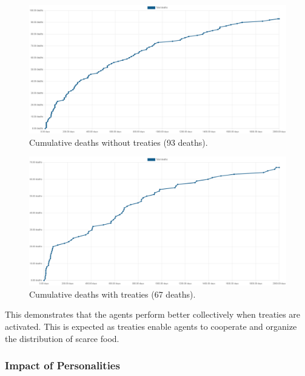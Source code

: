 \begin{figure}[h!]
    \begin{center}
        \includegraphics[scale=0.25]{009_team_7_agent_design/Images/Cumulative Deaths, WO Treaties, T7Only, 2000days, 20food, 93deaths.png}
    \end{center}
    \caption{Cumulative deaths without treaties (93 deaths).}
    \label{fig: Cumulative Deaths without Treaties}
\end{figure}

\begin{figure}[h!]
    \begin{center}
        \includegraphics[scale=0.25]{009_team_7_agent_design/Images/Cumulative Deaths, With Treaties, T7Only, 2000days, 20food, 67deaths.png}
    \end{center}
    \caption{Cumulative deaths with treaties (67 deaths).}
    \label{fig: Cumulative Deaths with Treaties}
\end{figure}

This demonstrates that the agents perform better collectively when treaties are activated. This is expected as treaties enable agents to cooperate and organize the distribution of scarce food. 

\newpage
\subsubsection{Impact of Personalities}
\label{subsubsec: Impact of Personalities}

